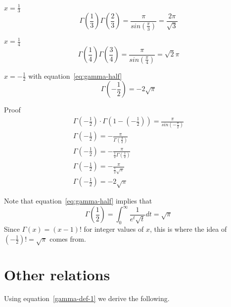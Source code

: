 \documentclass[a4paper]{article}
\begin{document}
    $x = \frac{1}{3}$
    \begin{equation}
        \Gamma(\frac{1}{3}) \Gamma(\frac{2}{3}) = \frac{\pi}{sin(\frac{\pi}{3})} = \frac{2\pi}{\sqrt{3}} \label{eq:equation7}
    \end{equation}

    $x = \frac{1}{4}$
    \begin{equation}
        \Gamma(\frac{1}{4}) \Gamma(\frac{3}{4}) = \frac{\pi}{sin(\frac{\pi}{4})} = \sqrt{2} \pi \label{eq:equation8}
    \end{equation}

    \begin{theorem}
        $x = -\frac{1}{2}$ with equation~\ref{eq:gamma-half}
        \begin{equation}
            \label{eq:negative-gamma-half}
            \Gamma(-\frac{1}{2}) = -2 \sqrt{\pi}
        \end{equation}

        Proof
        \\
        \begin{gather*}
            \Gamma(-\frac{1}{2}) \cdot \Gamma(1-(-\frac{1}{2})) = \frac{\pi}{sin(-\frac{\pi}{2})}
            \\
            \Gamma(-\frac{1}{2}) = -\frac{\pi}{\Gamma(\frac{3}{2})}
            \\
            \Gamma(-\frac{1}{2}) = -\frac{\pi}{\frac{1}{2} \Gamma(\frac{1}{2})}
            \\
            \Gamma(-\frac{1}{2}) = -\frac{\pi}{\frac{1}{2} \sqrt{\pi}}
            \\
            \Gamma(-\frac{1}{2}) = -2\sqrt{\pi}
        \end{gather*}

    \end{theorem}



    Note that equation~\ref{eq:gamma-half} implies that
    \begin{equation}
        \Gamma(\frac{1}{2}) = \int_{0}^{\infty} \frac{1}{e^t \sqrt{t}} dt = \sqrt{\pi} \label{eq:equation9}
    \end{equation}
    Since $\Gamma(x) = (x-1)!$ for integer values of $x$, this is where the idea of $(-\frac{1}{2})! = \sqrt{\pi}$ comes from.


    \section{Other relations}\label{sec:other-relations}
    Using equation~\ref{gamma-def-1} we derive the following.
\end{document}
